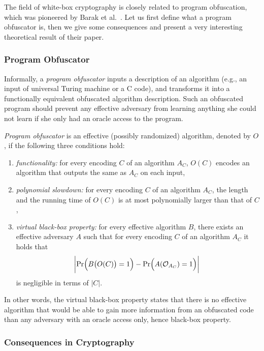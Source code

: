 The field of white-box cryptography is closely related to program obfuscation, which was pioneered by Barak et al.\ \cite{barak2001possibility}. Let us first define what a program obfuscator is, then we give some consequences and present a very interesting theoretical result of their paper.

\subsubsection{Program Obfuscator}
	
	Informally, a {\em program obfuscator} inputs a description of an algorithm (e.g., an input of universal Turing machine or a C code), and transforms it into a functionally equivalent obfuscated algorithm description. Such an obfuscated program should prevent any effective adversary from learning anything she could not learn if she only had an oracle access to the program.
	
	\begin{defn}
	\label{def:obfus}
		{\em Program obfuscator} is an effective (possibly randomized) algorithm, denoted by $O$, if the following three conditions hold:
		\begin{enumerate}
			\item {\em functionality:} for every encoding $C$ of an algorithm $A_C$, $O(C)$ encodes an algorithm that outputs the same as $A_C$ on each input,
			\item {\em polynomial slowdown:} for every encoding $C$ of an algorithm $A_C$, the length and the running time of $O(C)$ is at most polynomially larger than that of $C$,
			\item {\em virtual black-box property:} for every effective algorithm $B$, there exists an effective adversary $A$ such that for every encoding $C$ of an algorithm $A_C$ it holds that
			\[
				\biggl| \Pr\Bigl(B\bigl(O(C)\bigr)=1\Bigr) - \Pr\Bigl(A({\cal O}_{A_C})=1\Bigr) \biggr| \
			\]
			is negligible in terms of $|C|$.
		\end{enumerate}
	\end{defn}
	
	In other words, the virtual black-box property states that there is no effective algorithm that would be able to gain more information from an obfuscated code than any adversary with an oracle access only, hence black-box property.

\subsubsection{Consequences in Cryptography}
	
